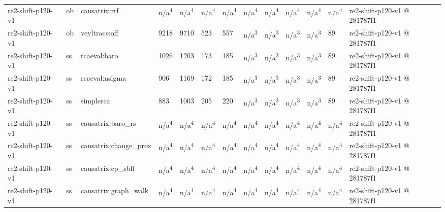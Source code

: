 \begin{table}[t]
\begin{tabular}{lllllllllllll}
re2-shift-p120-v1 & ob & causatrix:rrf & n/a\textsuperscript{4} & n/a\textsuperscript{4} & n/a\textsuperscript{4} & n/a\textsuperscript{4} & n/a\textsuperscript{4} & n/a\textsuperscript{4} & n/a\textsuperscript{4} & n/a\textsuperscript{4} & n/a\textsuperscript{4} & re2-shift-p120-v1 @ 281787f1 \\
re2-shift-p120-v1 & ob & veyltrace:off & 9218 & 9710 & 523 & 557 & n/a\textsuperscript{3} & n/a\textsuperscript{3} & n/a\textsuperscript{3} & n/a\textsuperscript{3} & 89 & re2-shift-p120-v1 @ 281787f1 \\
re2-shift-p120-v1 & ss & rcaeval:baro & 1026 & 1203 & 173 & 185 & n/a\textsuperscript{3} & n/a\textsuperscript{3} & n/a\textsuperscript{3} & n/a\textsuperscript{3} & 89 & re2-shift-p120-v1 @ 281787f1 \\
re2-shift-p120-v1 & ss & rcaeval:nsigma & 906 & 1169 & 172 & 185 & n/a\textsuperscript{3} & n/a\textsuperscript{3} & n/a\textsuperscript{3} & n/a\textsuperscript{3} & 89 & re2-shift-p120-v1 @ 281787f1 \\
re2-shift-p120-v1 & ss & simplerca & 883 & 1003 & 205 & 220 & n/a\textsuperscript{3} & n/a\textsuperscript{3} & n/a\textsuperscript{3} & n/a\textsuperscript{3} & 89 & re2-shift-p120-v1 @ 281787f1 \\
re2-shift-p120-v1 & ss & causatrix:baro\_rs & n/a\textsuperscript{4} & n/a\textsuperscript{4} & n/a\textsuperscript{4} & n/a\textsuperscript{4} & n/a\textsuperscript{4} & n/a\textsuperscript{4} & n/a\textsuperscript{4} & n/a\textsuperscript{4} & n/a\textsuperscript{4} & re2-shift-p120-v1 @ 281787f1 \\
re2-shift-p120-v1 & ss & causatrix:change\_prox & n/a\textsuperscript{4} & n/a\textsuperscript{4} & n/a\textsuperscript{4} & n/a\textsuperscript{4} & n/a\textsuperscript{4} & n/a\textsuperscript{4} & n/a\textsuperscript{4} & n/a\textsuperscript{4} & n/a\textsuperscript{4} & re2-shift-p120-v1 @ 281787f1 \\
re2-shift-p120-v1 & ss & causatrix:cp\_sbfl & n/a\textsuperscript{4} & n/a\textsuperscript{4} & n/a\textsuperscript{4} & n/a\textsuperscript{4} & n/a\textsuperscript{4} & n/a\textsuperscript{4} & n/a\textsuperscript{4} & n/a\textsuperscript{4} & n/a\textsuperscript{4} & re2-shift-p120-v1 @ 281787f1 \\
re2-shift-p120-v1 & ss & causatrix:graph\_walk & n/a\textsuperscript{4} & n/a\textsuperscript{4} & n/a\textsuperscript{4} & n/a\textsuperscript{4} & n/a\textsuperscript{4} & n/a\textsuperscript{4} & n/a\textsuperscript{4} & n/a\textsuperscript{4} & n/a\textsuperscript{4} & re2-shift-p120-v1 @ 281787f1 \\

\end{tabular}
\end{table}

